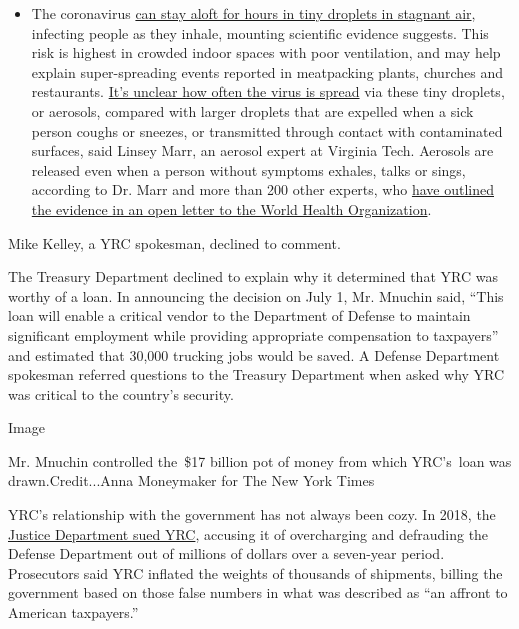 \begin{itemize}
  \begin{itemize}
  \tightlist
  \item
    The coronavirus
    \href{https://www.nytimes.com/2020/07/04/health/239-experts-with-one-big-claim-the-coronavirus-is-airborne.html?action=click\&pgtype=Article\&state=default\&region=MAIN_CONTENT_3\&context=storylines_faq}{can
    stay aloft for hours in tiny droplets in stagnant air}, infecting
    people as they inhale, mounting scientific evidence suggests. This
    risk is highest in crowded indoor spaces with poor ventilation, and
    may help explain super-spreading events reported in meatpacking
    plants, churches and restaurants.
    \href{https://www.nytimes.com/2020/07/06/health/coronavirus-airborne-aerosols.html?action=click\&pgtype=Article\&state=default\&region=MAIN_CONTENT_3\&context=storylines_faq}{It's
    unclear how often the virus is spread} via these tiny droplets, or
    aerosols, compared with larger droplets that are expelled when a
    sick person coughs or sneezes, or transmitted through contact with
    contaminated surfaces, said Linsey Marr, an aerosol expert at
    Virginia Tech. Aerosols are released even when a person without
    symptoms exhales, talks or sings, according to Dr. Marr and more
    than 200 other experts, who
    \href{https://academic.oup.com/cid/article/doi/10.1093/cid/ciaa939/5867798}{have
    outlined the evidence in an open letter to the World Health
    Organization}.
  \end{itemize}
\end{itemize}

Mike Kelley, a YRC spokesman, declined to comment.

The Treasury Department declined to explain why it determined that YRC
was worthy of a loan. In announcing the decision on July 1, Mr. Mnuchin
said, ``This loan will enable a critical vendor to the Department of
Defense to maintain significant employment while providing appropriate
compensation to taxpayers'' and estimated that 30,000 trucking jobs
would be saved. A Defense Department spokesman referred questions to the
Treasury Department when asked why YRC was critical to the country's
security.

Image

Mr. Mnuchin controlled the~\$17 billion pot of money from which
YRC's~loan was drawn.Credit...Anna Moneymaker for The New York Times

YRC's relationship with the government has not always been cozy. In
2018, the
\href{https://www.justice.gov/opa/pr/united-states-sues-freight-companies-systematic-overcharging-shipments}{Justice
Department sued YRC}, accusing it of overcharging and defrauding the
Defense Department out of millions of dollars over a seven-year period.
Prosecutors said YRC inflated the weights of thousands of shipments,
billing the government based on those false numbers in what was
described as ``an affront to American taxpayers.''

